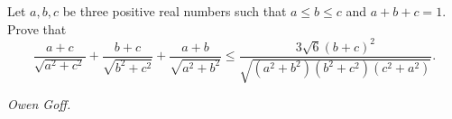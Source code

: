Let $a,b,c$ be three positive real numbers such that $ a \le b \le c$ and $a+b+c=1$. Prove that
\[\frac{a+c}{\sqrt{a^2+c^2}}+\frac{b+c}{\sqrt{b^2+c^2}}+\frac{a+b}{\sqrt{a^2+b^2}} \le \frac{3\sqrt{6}(b+c)^2}{\sqrt{(a^2+b^2)(b^2+c^2)(c^2+a^2)}}.\]

\textit{Owen Goff.}